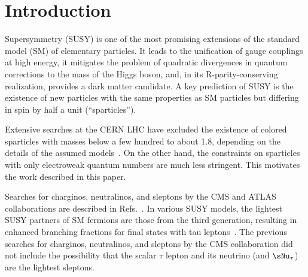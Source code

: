 \section{Introduction}
\label{sect:introduction}

Supersymmetry  (SUSY) \cite{Golfand:1971iw,Wess:1973kz,Wess:1974tw,Fayet1,Fayet2} is one of the most promising extensions of the 
standard model (SM) of elementary particles.  It leads to the unification of gauge couplings at
high energy, it mitigates the problem of quadratic divergences in quantum corrections to the
mass of the Higgs boson, and, in its R-parity-conserving realization, provides a dark matter candidate.
A key prediction of SUSY is the existence of new particles with the same properties as SM particles but
differing in spin by half a unit (``sparticles'').

Extensive searches at the CERN LHC have excluded the existence of colored sparticles with masses below a few hundred \GeV to about 1.8\TeV,
depending on the details of the assumed models~\cite{%
Chatrchyan:2013fea,Chatrchyan:2013mys,Chatrchyan:2014aea,Chatrchyan:2014lfa,%
Khachatryan:2015vra,Khachatryan:2015lwa,Aad:2015pfx,Aad:2015iea}. %
On the other hand, the constraints on sparticles with only electroweak quantum numbers are much less stringent.  This motivates the
work described in this paper.


Searches for charginos, neutralinos, and sleptons by the CMS and ATLAS collaborations are described in Refs.~\cite{Khachatryan:2014qwa,Khachatryan:2014mma,Khachatryan:2015kxa,Aad:2014nua,Aad:2014vma}.
In various SUSY models, the lightest SUSY partners of SM fermions are those from the third generation, 
resulting in enhanced branching fractions for final states with tau leptons~\cite{Martin:1997ns}.  
The previous searches for charginos, neutralinos,
and sleptons by the CMS collaboration \cite{Khachatryan:2014qwa} 
did not include the possibility that 
the scalar $\tau$ lepton and its neutrino (\stau and $\sNu_\tau$) 
are the lightest sleptons.


